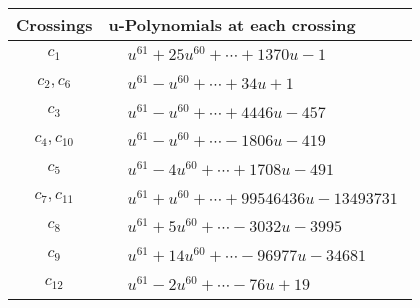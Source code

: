 \documentclass[1p]{elsarticle_modified}
\theoremstyle{definition}
\begin{document}
\begin{tabular}{m{50pt}|m{274pt}}
Crossings & \hspace{64pt}u-Polynomials at each crossing \\
\hline $$\begin{aligned}c_{1}\end{aligned}$$&$\begin{aligned}
&u^{61}+25 u^{60}+\cdots+1370 u-1
\end{aligned}$\\
\hline $$\begin{aligned}c_{2},c_{6}\end{aligned}$$&$\begin{aligned}
&u^{61}- u^{60}+\cdots+34 u+1
\end{aligned}$\\
\hline $$\begin{aligned}c_{3}\end{aligned}$$&$\begin{aligned}
&u^{61}- u^{60}+\cdots+4446 u-457
\end{aligned}$\\
\hline $$\begin{aligned}c_{4},c_{10}\end{aligned}$$&$\begin{aligned}
&u^{61}- u^{60}+\cdots-1806 u-419
\end{aligned}$\\
\hline $$\begin{aligned}c_{5}\end{aligned}$$&$\begin{aligned}
&u^{61}-4 u^{60}+\cdots+1708 u-491
\end{aligned}$\\
\hline $$\begin{aligned}c_{7},c_{11}\end{aligned}$$&$\begin{aligned}
&u^{61}+u^{60}+\cdots+99546436 u-13493731
\end{aligned}$\\
\hline $$\begin{aligned}c_{8}\end{aligned}$$&$\begin{aligned}
&u^{61}+5 u^{60}+\cdots-3032 u-3995
\end{aligned}$\\
\hline $$\begin{aligned}c_{9}\end{aligned}$$&$\begin{aligned}
&u^{61}+14 u^{60}+\cdots-96977 u-34681
\end{aligned}$\\
\hline $$\begin{aligned}c_{12}\end{aligned}$$&$\begin{aligned}
&u^{61}-2 u^{60}+\cdots-76 u+19
\end{aligned}$\\
\hline
\end{tabular}\\~\\
\end{document}
